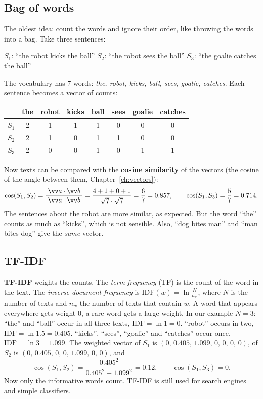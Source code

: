 \subsection*{Bag of words}
The oldest idea: count the words and ignore their order, like throwing the words into a bag. Take three sentences:
\begin{center}
$S_1$: ``the robot kicks the ball'' \quad $S_2$: ``the robot sees the ball'' \quad $S_3$: ``the goalie catches the ball''
\end{center}
The vocabulary has $7$ words: \emph{the, robot, kicks, ball, sees, goalie, catches}. Each sentence becomes a vector of counts:
\begin{center}
\renewcommand{\arraystretch}{1.15}
\begin{tabular}{l|ccccccc}
 & the & robot & kicks & ball & sees & goalie & catches\\ \hline
$S_1$ & 2 & 1 & 1 & 1 & 0 & 0 & 0\\
$S_2$ & 2 & 1 & 0 & 1 & 1 & 0 & 0\\
$S_3$ & 2 & 0 & 0 & 1 & 0 & 1 & 1\\
\end{tabular}
\end{center}
Now texts can be compared with the \textbf{cosine similarity} of the vectors (the cosine of the angle between them, Chapter~\ref{ch:vectors}):
\[
\cos(S_1,S_2)=\frac{\vv a\cdot\vv b}{|\vv a|\,|\vv b|}=\frac{4+1+0+1}{\sqrt7\cdot\sqrt7}=\frac67=0.857,
\qquad
\cos(S_1,S_3)=\frac{5}{7}=0.714.
\]
The sentences about the robot are more similar, as expected. But the word ``the'' counts as much as ``kicks'', which is not sensible. Also, ``dog bites man'' and ``man bites dog'' give the \emph{same} vector.

\subsection*{TF-IDF}
\textbf{TF-IDF} weights the counts. The \emph{term frequency} (TF) is the count of the word in the text. The \emph{inverse document frequency} is $\mathrm{IDF}(w)=\ln\frac{N}{n_w}$, where $N$ is the number of texts and $n_w$ the number of texts that contain $w$. A word that appears everywhere gets weight $0$, a rare word gets a large weight. In our example $N=3$: ``the'' and ``ball'' occur in all three texts, $\mathrm{IDF}=\ln1=0$. ``robot'' occurs in two, $\mathrm{IDF}=\ln1.5=0.405$. ``kicks'', ``sees'', ``goalie'' and ``catches'' occur once, $\mathrm{IDF}=\ln3=1.099$. The weighted vector of $S_1$ is $(0,\,0.405,\,1.099,\,0,\,0,\,0,\,0)$, of $S_2$ is $(0,\,0.405,\,0,\,0,\,1.099,\,0,\,0)$, and
\[
\cos(S_1,S_2)=\frac{0.405^2}{0.405^2+1.099^2}=0.12,\qquad \cos(S_1,S_3)=0.
\]
Now only the informative words count. TF-IDF is still used for search engines and simple classifiers.

